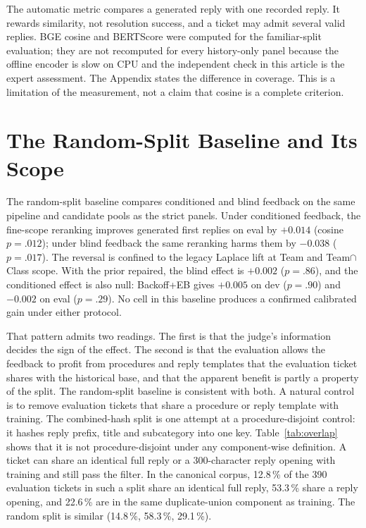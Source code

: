 \documentclass{ieeeaccess}
\begin{document}
The automatic metric compares a generated reply with one recorded reply. It
rewards similarity, not resolution success, and a ticket may admit several valid
replies. BGE cosine \cite{b25} and BERTScore \cite{b26} were computed for the
familiar-split evaluation; they are not recomputed for every history-only panel because the
offline encoder is slow on CPU and the independent check in this article is the
expert assessment. The Appendix states the difference in coverage. This is a
limitation of the measurement, not a claim that cosine is a complete criterion.


\section{The Random-Split Baseline and Its Scope}
\label{sec:baseline}

The random-split baseline compares conditioned and blind feedback on the same
pipeline and candidate pools as the strict panels. Under conditioned feedback, the fine-scope reranking improves generated
first replies on eval by $+0.014$ (cosine $p=.012$); under blind feedback the same
reranking harms them by $-0.038$ ($p=.017$). The reversal is confined to the legacy
Laplace lift at Team and Team$\cap$Class scope. With the prior repaired, the blind
effect is $+0.002$ ($p=.86$), and the conditioned effect is also null: Backoff+EB
gives $+0.005$ on dev ($p=.90$) and $-0.002$ on eval ($p=.29$). No cell in this
baseline produces a confirmed calibrated gain under either protocol.

That pattern admits two readings. The first is that the judge's information decides
the sign of the effect. The second is that the evaluation allows the feedback to
profit from procedures and reply templates that the evaluation ticket shares with
the historical base, and that the apparent benefit is partly a property of the
split. The random-split baseline is consistent with both. A natural control is to
remove evaluation tickets that share a procedure or reply template with training.
The combined-hash split is one attempt at a procedure-disjoint control: it hashes
reply prefix, title and subcategory into one key. Table~\ref{tab:overlap} shows that it is not
procedure-disjoint under any component-wise definition. A ticket can share an identical full reply or a
300-character reply opening with training and still pass the filter. In the
canonical corpus, 12.8\,\% of the 390 evaluation tickets in such a split share an
identical full reply, 53.3\,\% share a reply opening, and 22.6\,\% are in the same
duplicate-union component as training. The random split is similar (14.8\,\%,
58.3\,\%, 29.1\,\%).
\end{document}
